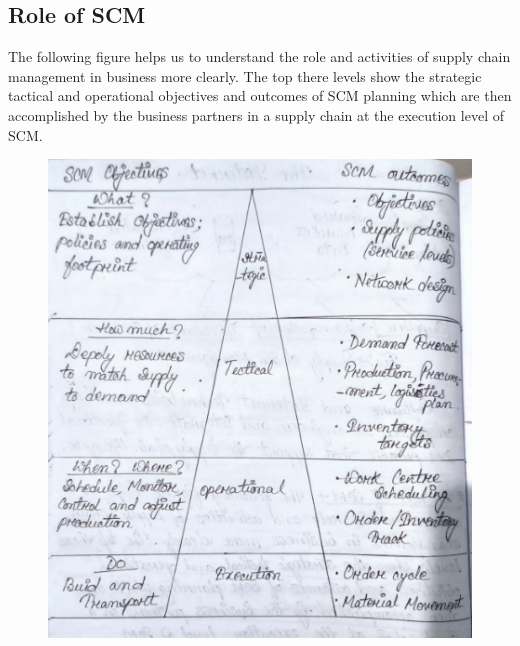 \documentclass[twocolumn, 12pt, a4paper]{article}
\begin{document}
\subsection{Role of SCM}
The following figure helps us to understand the role and activities of supply chain management in business more clearly. The top there levels show the strategic tactical and operational objectives and outcomes of SCM  planning which are then accomplished by the business partners in a supply chain at the execution level of SCM.

\begin{figure}[ht]
  \includegraphics[width=\columnwidth]{roleofscm}
\end{figure}
\end{document}
